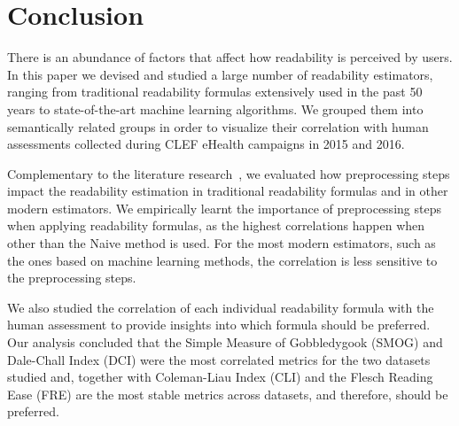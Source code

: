 
\section{Conclusion}
\label{sec:conclusion_doc_analysis}


There is an abundance of factors that affect how readability is perceived by users. 
In this paper we devised and studied a large number of readability estimators, ranging from traditional readability formulas extensively used in the past 50 years to state-of-the-art machine learning algorithms.
We grouped them into semantically related groups in order to visualize their correlation with human assessments collected during CLEF eHealth campaigns in 2015 and 2016.

Complementary to the literature research~\cite{palotti15}, we evaluated how preprocessing steps impact the readability estimation in traditional readability formulas and in other modern estimators. We empirically learnt the importance of preprocessing steps when applying readability formulas, as the highest correlations happen when other than the Naive method is used.
For the most modern estimators, such as the ones based on machine learning methods, the correlation is less sensitive to the preprocessing steps.

We also studied the correlation of each individual readability formula with the human assessment to provide insights into which formula should be preferred. Our analysis concluded that the Simple Measure of Gobbledygook (SMOG) and Dale-Chall Index (DCI) were the most correlated metrics for the two datasets studied and, together with Coleman-Liau Index (CLI) and the Flesch Reading Ease (FRE) are the most stable metrics across datasets, and therefore, should be preferred.


